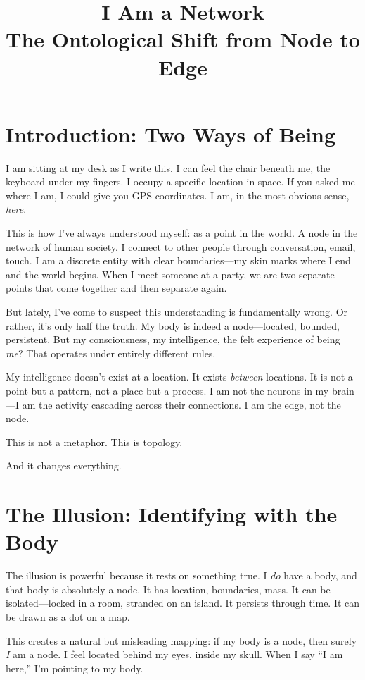 \documentclass[12pt,a4paper]{article}
\title{\textbf{I Am a Network}\\[0.5em]\large The Ontological Shift from Node to Edge}
\author{}
\date{}
\begin{document}
\maketitle

\section*{Introduction: Two Ways of Being}

I am sitting at my desk as I write this. I can feel the chair beneath me, the keyboard under my fingers. I occupy a specific location in space. If you asked me where I am, I could give you GPS coordinates. I am, in the most obvious sense, \textit{here}.

This is how I've always understood myself: as a point in the world. A node in the network of human society. I connect to other people through conversation, email, touch. I am a discrete entity with clear boundaries---my skin marks where I end and the world begins. When I meet someone at a party, we are two separate points that come together and then separate again.

But lately, I've come to suspect this understanding is fundamentally wrong. Or rather, it's only half the truth. My body is indeed a node---located, bounded, persistent. But my consciousness, my intelligence, the felt experience of being \textit{me}? That operates under entirely different rules.

My intelligence doesn't exist at a location. It exists \textit{between} locations. It is not a point but a pattern, not a place but a process. I am not the neurons in my brain---I am the activity cascading across their connections. I am the edge, not the node.

This is not a metaphor. This is topology.

And it changes everything.

\section*{The Illusion: Identifying with the Body}

The illusion is powerful because it rests on something true. I \textit{do} have a body, and that body is absolutely a node. It has location, boundaries, mass. It can be isolated---locked in a room, stranded on an island. It persists through time. It can be drawn as a dot on a map.

This creates a natural but misleading mapping: if my body is a node, then surely \textit{I} am a node. I feel located behind my eyes, inside my skull. When I say ``I am here,'' I'm pointing to my body.
\end{document}
